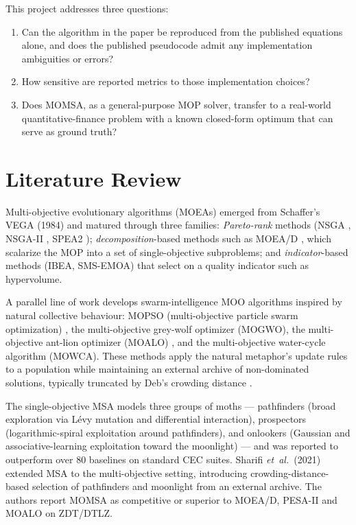 \documentclass[11pt,a4paper]{article}
\begin{document}
This project addresses three questions:
\begin{enumerate}[label=(\roman*),leftmargin=2em]
\item Can the algorithm in the paper be reproduced from the published
equations alone, and does the published pseudocode admit any
implementation ambiguities or errors?
\item How sensitive are reported metrics to those implementation choices?
\item Does MOMSA, as a general-purpose MOP solver, transfer to a
real-world quantitative-finance problem with a known closed-form optimum
that can serve as ground truth?
\end{enumerate}

\section{Literature Review}
\label{sec:lit}

Multi-objective evolutionary algorithms (MOEAs) emerged from Schaffer's
VEGA (1984) and matured through three families: \emph{Pareto-rank} methods
(NSGA \cite{srinivas1994nsga}, NSGA-II \cite{deb2002nsga2}, SPEA2
\cite{zitzler2001spea2}); \emph{decomposition}-based methods such as
MOEA/D \cite{zhang2007moead}, which scalarize the MOP into a set of
single-objective subproblems; and \emph{indicator}-based methods
(IBEA, SMS-EMOA) that select on a quality indicator such as hypervolume.

A parallel line of work develops swarm-intelligence MOO algorithms
inspired by natural collective behaviour: MOPSO (multi-objective particle
swarm optimization) \cite{coello2004mopso}, the multi-objective grey-wolf
optimizer (MOGWO), the multi-objective ant-lion optimizer (MOALO)
\cite{mirjalili2017moalo}, and the multi-objective water-cycle algorithm
(MOWCA). These methods apply the natural metaphor's update rules to a
population while maintaining an external archive of non-dominated
solutions, typically truncated by Deb's crowding distance
\cite{deb2002nsga2}.

The single-objective MSA \cite{mohamed2018msa} models three groups of
moths --- pathfinders (broad exploration via L\'evy mutation and
differential interaction), prospectors (logarithmic-spiral exploitation
around pathfinders), and onlookers (Gaussian and associative-learning
exploitation toward the moonlight) --- and was reported to outperform
over 80 baselines on standard CEC suites. Sharifi
\textit{et~al.}\ (2021) extended MSA to the multi-objective setting,
introducing crowding-distance-based selection of pathfinders and
moonlight from an external archive. The authors report MOMSA as
competitive or superior to MOEA/D, PESA-II and MOALO on ZDT/DTLZ.
\end{document}
